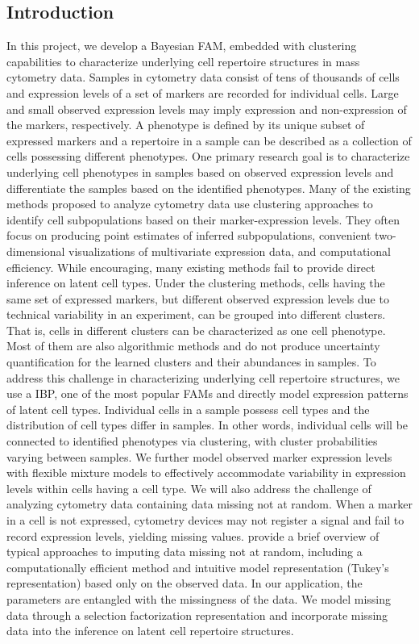 \documentclass[12pt,]{article}
\begin{document}
\subsection{Introduction}

In this project, we develop a Bayesian FAM, embedded with clustering
capabilities to characterize underlying cell repertoire structures in mass
cytometry data.  Samples in cytometry data consist of tens of thousands of
cells and expression levels of a set of markers are recorded for individual
cells. Large and small observed expression levels may imply expression and
non-expression of the markers, respectively.  A phenotype is defined by its
unique subset of expressed markers and a repertoire in a sample can be
described as a collection of cells possessing different phenotypes.  One
primary research goal is to characterize underlying cell phenotypes in samples
based on observed expression levels and differentiate the samples based on the
identified phenotypes.  Many of the existing methods proposed to analyze
cytometry data use clustering approaches to identify cell subpopulations based
on their marker-expression levels.  They often focus on producing point
estimates of inferred subpopulations, convenient two-dimensional visualizations
of multivariate expression data, and computational efficiency.  While
encouraging, many existing methods fail to provide direct inference on latent
cell types.  Under the clustering methods, cells having the same set of
expressed markers, but different observed expression levels due to technical
variability in an experiment, can be grouped into different clusters.  That is,
cells in different clusters can be characterized as one cell phenotype.  Most
of them are also algorithmic methods and do not produce uncertainty
quantification for the learned clusters and their abundances in samples.  To
address this challenge in characterizing underlying cell repertoire structures,
we use a IBP, one of the most popular FAMs and directly model expression
patterns of latent cell types.  Individual cells in a sample possess cell types
and the distribution of cell types differ in samples. In other words, individual
cells will be connected to identified phenotypes via clustering, with
cluster probabilities varying between samples.  We further model observed
marker expression levels with flexible mixture models to effectively
accommodate variability in expression levels within cells having a cell type.
We will also address the challenge of analyzing cytometry data containing data
missing not at random.  When a marker in a cell is not expressed, cytometry
devices may not register a signal and fail to record expression levels,
yielding missing values.  \cite{franks2016non} provide a brief overview of
typical approaches to imputing data missing not at random, including a
computationally efficient method and intuitive model representation (Tukey's
representation) based only on the observed data.  In our application, the
parameters are entangled with the missingness of the data.  We model missing
data through a selection factorization representation
\citep{rubin1974characterizing} and incorporate missing data into the inference on latent cell repertoire structures.
\end{document}
